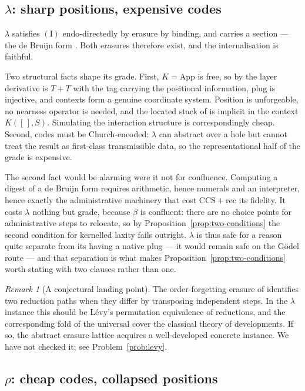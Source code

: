 \documentclass[11pt,a4paper]{article}
\theoremstyle{definition}
\theoremstyle{plain}
\theoremstyle{remark}
\newtheorem{remark}[definition]{Remark}
\newcommand{\rhoc}{\rho}
\newcommand{\CCSrec}{\mathrm{CCS}{+}\mathrm{rec}}
\newcommand{\Icond}{(\mathrm{I})}
\begin{document}
\subsection{$\lambda$: sharp positions, expensive codes}

$\lambda$ satisfies $\Icond$ endo-directedly by erasure by binding, and carries a section --- the de
Bruijn form \cite[\S5.2]{cost}. Both erasures therefore exist, and the internalisation is faithful.

Two structural facts shape its grade. First, $K = \mathrm{App}$ is free, so by \cite[\S2.3]{probe}
the layer derivative is $T + T$ with the tag carrying the positional information, $\mathrm{plug}$ is
injective, and contexts form a genuine coordinate system. Position is unforgeable, no nearness
operator is needed, and the located stack of \cite[\S10]{cost} is implicit in the context
$K([\,],S)$. Simulating the interaction structure is correspondingly cheap. Second, codes must be
Church-encoded: $\lambda$ can abstract over a hole but cannot treat the result as first-class
transmissible data, so the representational half of the grade is expensive.

The second fact would be alarming were it not for confluence. Computing a digest of a de Bruijn form
requires arithmetic, hence numerals and an interpreter, hence exactly the administrative machinery
that cost $\CCSrec$ its fidelity. It costs $\lambda$ nothing but grade, because $\beta$ is confluent:
there are no choice points for administrative steps to relocate, so by
Proposition~\ref{prop:two-conditions} the second condition for kernelled laxity fails outright.
$\lambda$ is thus safe for a reason quite separate from its having a native plug --- it would remain
safe on the Gödel route --- and that separation is what makes
Proposition~\ref{prop:two-conditions} worth stating with two clauses rather than one.

\begin{remark}[A conjectural landing point]
\label{rmk:levy}
The order-forgetting erasure of \cite[Rmk.~4.3]{history} identifies two reduction paths when they
differ by transposing independent steps. In the $\lambda$ instance this should be Lévy's permutation
equivalence of reductions, and the corresponding fold of the universal cover the classical theory of
developments. If so, the abstract erasure lattice acquires a well-developed concrete instance. We
have not checked it; see Problem~\ref{prob:levy}.
\end{remark}

\subsection{$\rhoc$: cheap codes, collapsed positions}
\end{document}
